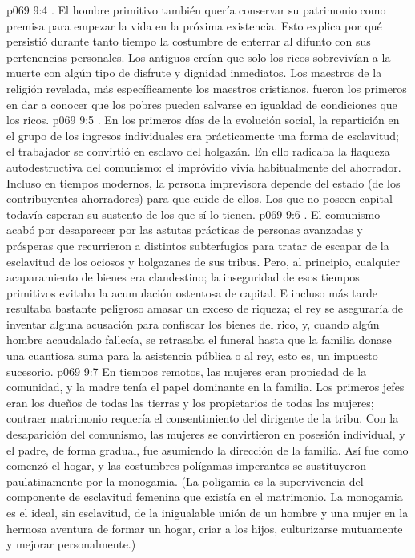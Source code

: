 \vs p069 9:4 . El hombre primitivo también quería conservar su patrimonio como premisa para empezar la vida en la próxima existencia. Esto explica por qué persistió durante tanto tiempo la costumbre de enterrar al difunto con sus pertenencias personales. Los antiguos creían que solo los ricos sobrevivían a la muerte con algún tipo de disfrute y dignidad inmediatos. Los maestros de la religión revelada, más específicamente los maestros cristianos, fueron los primeros en dar a conocer que los pobres pueden salvarse en igualdad de condiciones que los ricos.
\vs p069 9:5 . En los primeros días de la evolución social, la repartición en el grupo de los ingresos individuales era prácticamente una forma de esclavitud; el trabajador se convirtió en esclavo del holgazán. En ello radicaba la flaqueza autodestructiva del comunismo: el impróvido vivía habitualmente del ahorrador. Incluso en tiempos modernos, la persona imprevisora depende del estado (de los contribuyentes ahorradores) para que cuide de ellos. Los que no poseen capital todavía esperan su sustento de los que sí lo tienen.
\vs p069 9:6 . El comunismo acabó por desaparecer por las astutas prácticas de personas avanzadas y prósperas que recurrieron a distintos subterfugios para tratar de escapar de la esclavitud de los ociosos y holgazanes de sus tribus. Pero, al principio, cualquier acaparamiento de bienes era clandestino; la inseguridad de esos tiempos primitivos evitaba la acumulación ostentosa de capital. E incluso más tarde resultaba bastante peligroso amasar un exceso de riqueza; el rey se aseguraría de inventar alguna acusación para confiscar los bienes del rico, y, cuando algún hombre acaudalado fallecía, se retrasaba el funeral hasta que la familia donase una cuantiosa suma para la asistencia pública o al rey, esto es, un impuesto sucesorio.
\vs p069 9:7 En tiempos remotos, las mujeres eran propiedad de la comunidad, y la madre tenía el papel dominante en la familia. Los primeros jefes eran los dueños de todas las tierras y los propietarios de todas las mujeres; contraer matrimonio requería el consentimiento del dirigente de la tribu. Con la desaparición del comunismo, las mujeres se convirtieron en posesión individual, y el padre, de forma gradual, fue asumiendo la dirección de la familia. Así fue como comenzó el hogar, y las costumbres polígamas imperantes se sustituyeron paulatinamente por la monogamia. (La poligamia es la supervivencia del componente de esclavitud femenina que existía en el matrimonio. La monogamia es el ideal, sin esclavitud, de la inigualable unión de un hombre y una mujer en la hermosa aventura de formar un hogar, criar a los hijos, culturizarse mutuamente y mejorar personalmente.)
